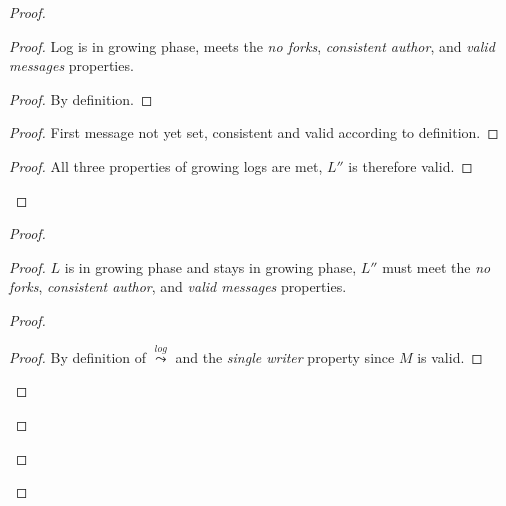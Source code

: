 \documentclass[9pt, oneside]{article}   	%
\newcommand{\logleadsto}{\overset{\textit{log}}\leadsto}
\begin{document}
\begin{proof}
	\begin{proof}
			Log is in growing phase, meets the \textit{no forks}, \textit{consistent author}, and \textit{valid messages} properties.
		\begin{proof}
			By definition.
		\end{proof}
		
		\begin{proof}
		 	First message not yet set, consistent and valid according to definition.
		\end{proof}

		\qedstep{}
		\begin{proof}
			All three properties of growing logs are met, $L''$ is therefore valid.
		\end{proof}
	\end{proof}
	
	\begin{proof}
		\begin{proof}
			$L$ is in growing phase and stays in growing phase, $L''$ must meet the \textit{no forks}, \textit{consistent author}, and \textit{valid messages} properties.		
			\begin{proof}

					\step{}{\case{$L_\textit{last} \logleadsto M \Rightarrow L''_\textit{last} = M$}}
					\begin{proof}
						By definition of $\logleadsto$ and the \textit{single writer} property since $M$ is valid.
					\end{proof}
					

\end{proof}
\end{proof}
\end{proof}
\end{proof}
\end{document}
